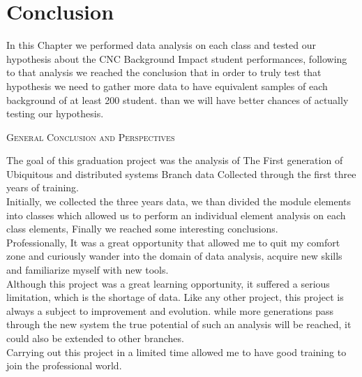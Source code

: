 \documentclass[12pt]{extreport}
\begin{document}
\section{Conclusion}
In this Chapter we performed data analysis on each class and tested our hypothesis about the CNC Background Impact student performances, following to that analysis we reached the conclusion that in order to truly test that hypothesis we need to gather more data to have equivalent samples of each background of at least 200 student. than we will have better chances of actually testing our hypothesis. 

\newpage
\thispagestyle{empty}
\begin{center}
	\textsc{\Huge General Conclusion and Perspectives\\[2cm]
	}
\end{center}



The goal of this graduation project was the analysis of The First generation of Ubiquitous and distributed systems Branch data Collected through the first three years of training.\\


Initially, we collected the three years data, we than divided the module elements into classes which allowed us to perform an individual element analysis on each class elements, Finally we reached some interesting conclusions.\\


Professionally, It was a great opportunity that allowed me to quit my comfort zone and curiously wander into the domain of data analysis, acquire new skills and familiarize myself with new tools.\\


Although this project was a great learning opportunity, it suffered a serious limitation, which is the shortage of data. Like any other project, this project is always a subject to improvement and evolution. while more generations pass through the new system  the true potential of such an analysis will be reached, it could also be extended to other branches.\\


Carrying out this project in a limited time allowed me to have good training to join the professional world.
 
\end{document}
